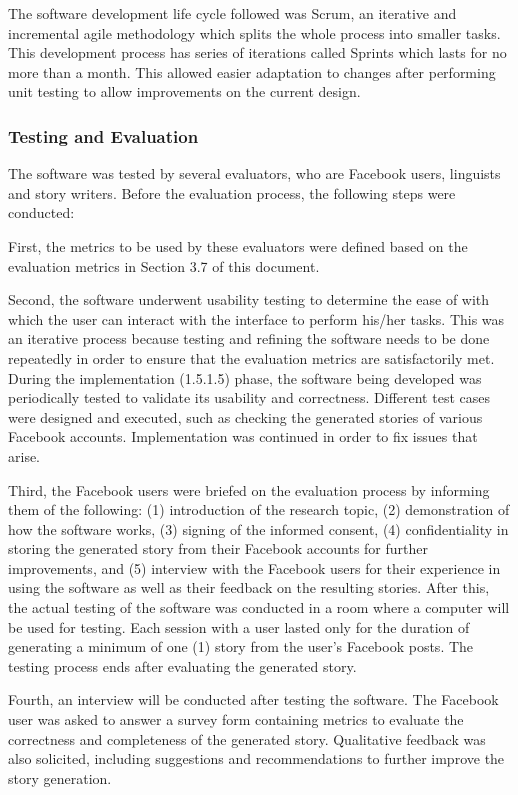 The software development life cycle followed was Scrum, an iterative and incremental agile methodology which splits the whole process into smaller tasks. This development process has series of iterations called Sprints which lasts for no more than a month. This allowed easier adaptation to changes after performing unit testing to allow improvements on the current design.

\subsubsection{Testing and Evaluation}
The software was tested by several evaluators, who are Facebook users, linguists and story writers. Before the evaluation process, the following steps were conducted:

First, the metrics to be used by these evaluators were defined based on the evaluation metrics in Section 3.7 of this document.

Second, the software underwent usability testing to determine the ease of with which the user can interact with the interface to perform his/her tasks. This was an iterative process because testing and refining the software needs to be done repeatedly in order to ensure that the evaluation metrics are satisfactorily met. During the implementation (1.5.1.5) phase, the software being developed was periodically tested to validate its usability and correctness. Different test cases were designed and executed, such as checking the generated stories of various Facebook accounts. Implementation was continued in order to fix issues that arise.

Third, the Facebook users were briefed on the evaluation process by informing them of the following: (1) introduction of the research topic, (2) demonstration of how the software works, (3) signing of the informed consent, (4) confidentiality in storing the generated story from their Facebook accounts for further improvements, and (5) interview with the Facebook users for their experience in using the software as well as their feedback on the resulting stories. After this, the actual testing of the software was conducted in a room where a computer will be used for testing. Each session with a user lasted only for the duration of generating a minimum of one (1) story from the user's Facebook posts. The testing process ends after evaluating the generated story.

Fourth, an interview will be conducted after testing the software. The Facebook user was asked to answer a survey form containing metrics to evaluate the correctness and completeness of the generated story. Qualitative feedback was also solicited, including suggestions and recommendations to further improve the story generation.

